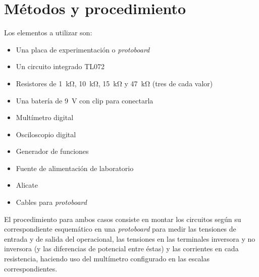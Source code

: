 \section{Métodos y procedimiento}

Los elementos a utilizar son:

\begin{itemize}
    \item Una placa de experimentación o \textit{protoboard}
    \item Un circuito integrado TL072
    \item Resistores de \SI{1}{\kilo\ohm}, \SI{10}{\kilo\ohm},
        \SI{15}{\kilo\ohm} y \SI{47}{\kilo\ohm} (tres de cada valor)
    \item Una batería de \SI{9}{\volt} con clip para conectarla
    \item Multímetro digital
    \item Osciloscopio digital
    \item Generador de funciones
    \item Fuente de alimentación de laboratorio
    \item Alicate
    \item Cables para \textit{protoboard}
\end{itemize}

El procedimiento para ambos casos consiste en montar los circuitos según su 
correspondiente esquemático en una \textit{protoboard} para medir las tensiones
de entrada y de salida del operacional, las tensiones en las terminales inversora y
no inversora (y las diferencias de potencial entre éstas) y las corrientes en
cada resistencia, haciendo uso del multímetro configurado en las escalas
correspondientes.
